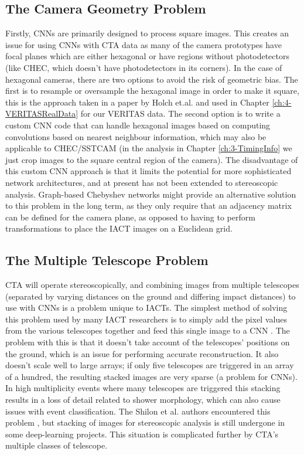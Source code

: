 \subsection{The Camera Geometry Problem}

Firstly, CNNs are primarily designed to process square images. This creates an issue for using CNNs with CTA data as many of the camera prototypes have focal planes which are either hexagonal or have regions without photodetectors (like CHEC, which doesn't have photodetectors in its corners). In the case of hexagonal cameras, there are two options to avoid the risk of geometric bias. The first is to resample or oversample the hexagonal image in order to make it square, this is the approach taken in a paper by Holch et.al. \cite{Hexagdly} and used in Chapter \ref{ch:4-VERITASRealData} for our VERITAS data. The second option is to write a custom CNN code that can handle hexagonal images based on computing convolutions based on nearest neighbour information, which may also be applicable to CHEC/SSTCAM (in the analysis in Chapter \ref{ch:3-TimingInfo} we just crop images to the square central region of the camera). The disadvantage of this custom CNN approach is that it limits the potential for more sophisticated network architectures, and at present has not been extended to stereoscopic analysis. Graph-based Chebyshev networks \cite{adithesis} might provide an alternative solution to this problem in the long term, as they only require that an adjacency matrix can be defined for the camera plane, as opposed to having to perform transformations to place the IACT images on a Euclidean grid. 

\subsection{The Multiple Telescope Problem}

CTA will operate stereoscopically, and combining images from multiple telescopes (separated by varying distances on the ground and differing impact distances) to use with CNNs is a problem unique to IACTs. The simplest method of solving this problem used by many IACT researchers is to simply add the pixel values from the various telescopes together and feed this single image to a CNN \cite{mangano}. The problem with this is that it doesn't take account of the telescopes' positions on the ground, which is an issue for performing accurate reconstruction. It also doesn't scale well to large arrays; if only five telescopes are triggered in an array of a hundred, the resulting stacked images are very sparse (a problem for CNNs). In high multiplicity events where many telescopes are triggered this stacking results in a loss of detail related to shower morphology, which can also cause issues with event classification. The Shilon et al. authors encountered this problem \cite{Shilon}, but stacking of images for stereoscopic analysis is still undergone in some deep-learning projects. This situation is complicated further by CTA's multiple classes of telescope.

